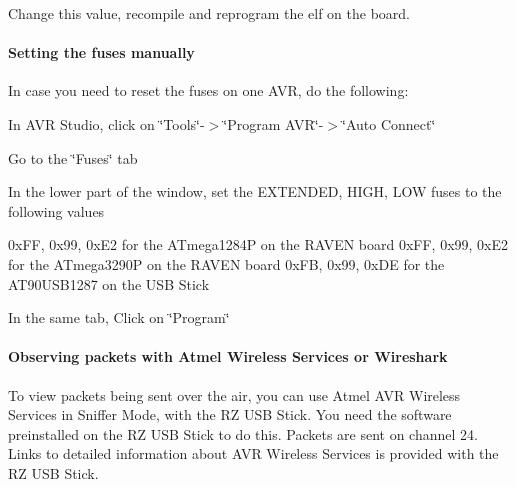 \begin{DoxyItemize}
\item \-Change this value, recompile and reprogram the elf on the board.\end{DoxyItemize}
\hypertarget{a00058_advanced_fuses}{}\paragraph{\-Setting the fuses manually}\label{a00058_advanced_fuses}
\-In case you need to reset the fuses on one \-A\-V\-R, do the following\-: \begin{DoxyItemize}
\item \-In \-A\-V\-R \-Studio, click on \char`\"{}\-Tools\char`\"{}-\/$>$\char`\"{}\-Program A\-V\-R\char`\"{}-\/$>$\char`\"{}\-Auto Connect\char`\"{} \item \-Go to the \char`\"{}\-Fuses\char`\"{} tab \item \-In the lower part of the window, set the \-E\-X\-T\-E\-N\-D\-E\-D, \-H\-I\-G\-H, \-L\-O\-W fuses to the following values \begin{DoxyVerb}
0xFF, 0x99, 0xE2 for the ATmega1284P on the RAVEN board
0xFF, 0x99, 0xE2 for the ATmega3290P on the RAVEN board
0xFB, 0x99, 0xDE for the AT90USB1287 on the USB Stick
\end{DoxyVerb}
 \item \-In the same tab, \-Click on \char`\"{}\-Program\char`\"{} \end{DoxyItemize}
\hypertarget{a00058_advanced_capture}{}\paragraph{\-Observing packets with Atmel Wireless Services or Wireshark}\label{a00058_advanced_capture}
\-To view packets being sent over the air, you can use \-Atmel \-A\-V\-R \-Wireless \-Services in \-Sniffer \-Mode, with the \-R\-Z \-U\-S\-B \-Stick. \-You need the software preinstalled on the \-R\-Z \-U\-S\-B \-Stick to do this. \-Packets are sent on channel 24. \-Links to detailed information about \-A\-V\-R \-Wireless \-Services is provided with the \-R\-Z \-U\-S\-B \-Stick.

